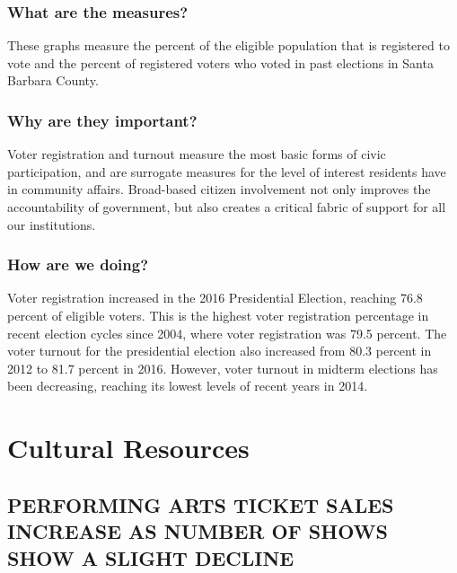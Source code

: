 \documentclass[]{book}
\theoremstyle{definition}
\theoremstyle{definition}
\theoremstyle{definition}
\theoremstyle{remark}
\begin{document}
\subsubsection*{What are the measures?}\label{what-are-the-measures-4}

These graphs measure the percent of the eligible population that is
registered to vote and the percent of registered voters who voted in
past elections in Santa Barbara County.

\subsubsection*{Why are they important?}\label{why-are-they-important-3}

Voter registration and turnout measure the most basic forms of civic
participation, and are surrogate measures for the level of interest
residents have in community affairs. Broad-based citizen involvement not
only improves the accountability of government, but also creates a
critical fabric of support for all our institutions.

\subsubsection*{How are we doing?}\label{how-are-we-doing-20}

Voter registration increased in the 2016 Presidential Election, reaching
76.8 percent of eligible voters. This is the highest voter registration
percentage in recent election cycles since 2004, where voter
registration was 79.5 percent. The voter turnout for the presidential
election also increased from 80.3 percent in 2012 to 81.7 percent in
2016. However, voter turnout in midterm elections has been decreasing,
reaching its lowest levels of recent years in 2014.

\section*{Cultural Resources}\label{cultural-resources}

\subsection*{PERFORMING ARTS TICKET SALES INCREASE AS NUMBER OF SHOWS
SHOW A SLIGHT
DECLINE}\label{performing-arts-ticket-sales-increase-as-number-of-shows-show-a-slight-decline}
\end{document}
